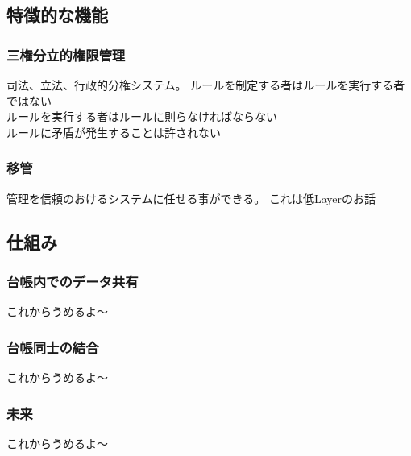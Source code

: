 \documentclass[10pt,a4paper]{jarticle}
\begin{document}
\begin{multicols}{2}
\subsection{特徴的な機能}

\subsubsection{三権分立的権限管理}
司法、立法、行政的分権システム。
ルールを制定する者はルールを実行する者ではない\\
ルールを実行する者はルールに則らなければならない\\
ルールに矛盾が発生することは許されない\\

\subsubsection{移管}
管理を信頼のおけるシステムに任せる事ができる。
これは低Layerのお話

\subsection{仕組み}

\subsubsection{台帳内でのデータ共有}
これからうめるよ〜

\subsubsection{台帳同士の結合}
これからうめるよ〜

\subsubsection{未来}
これからうめるよ〜

\end{multicols}
\end{document}
